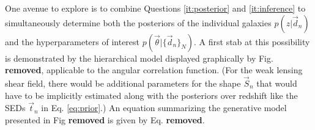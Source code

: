 \documentclass[12pt, onecolumn]{emulateapj}
\begin{document}
One avenue to explore is to combine Questions \ref{it:posterior} and \ref{it:inference} to simultaneously determine both the posteriors of the individual galaxies $p(z|\vec{d}_{n})$ and the hyperparameters of interest $p(\vec{\theta}|\{\vec{d}_{n}\}_{N})$.  A first stab at this possibility is demonstrated by the hierarchical model displayed graphically by Fig. \textbf{removed}, applicable to the angular correlation function.  (For the weak lensing shear field, there would be additional parameters for the shape $\vec{S}_{n}$ that would have to be implicitly estimated along with the posteriors over redshift like the SEDs $\vec{t}_{n}$ in Eq. \ref{eq:prior}.)  An equation summarizing the generative model presented in Fig \textbf{removed} is given by Eq. \textbf{removed}.

%
%
%
\end{document}
